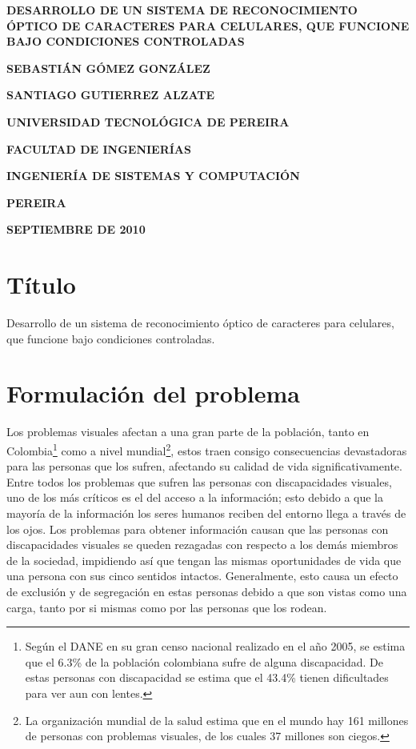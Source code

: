 \documentclass[a4paper, 11pt, oneside]{article}
\newcommand\portada{
	\begin{titlepage}
		\begin{center}
			{\large \bf DESARROLLO DE UN SISTEMA DE RECONOCIMIENTO ÓPTICO DE CARACTERES PARA CELULARES, QUE FUNCIONE BAJO CONDICIONES CONTROLADAS }
			\vfill
			{\large\bf SEBASTIÁN GÓMEZ GONZÁLEZ \par}
			{\large\bf SANTIAGO GUTIERREZ ALZATE \par}
			\vfill
			{\large\bf UNIVERSIDAD TECNOLÓGICA DE PEREIRA  \par}
			{\large\bf FACULTAD DE INGENIERÍAS \par}
			{\large\bf INGENIERÍA DE SISTEMAS Y COMPUTACIÓN \par}
			{\large\bf PEREIRA\par}
			{\large\bf SEPTIEMBRE DE 2010 \par}
		\end{center}
	\end{titlepage}
}
\begin{document}
\portada

	\clearpage
	\section{Título}

	Desarrollo de un sistema de reconocimiento óptico de caracteres para celulares, que funcione bajo condiciones controladas.
	
	\section{Formulación del problema}

	Los problemas visuales afectan a una gran parte de la población, tanto en Colombia\footnote{Según el DANE en su gran censo nacional realizado en el año 2005, se estima que el 6.3\% de la población colombiana sufre de alguna discapacidad. De estas personas con discapacidad se estima que el 43.4\% tienen dificultades para ver aun con lentes.} como a nivel mundial\footnote{La organización mundial de la salud estima que en el mundo hay 161 millones de personas con problemas visuales, de los cuales 37 millones son ciegos.}, estos traen consigo consecuencias devastadoras para las personas que los sufren, afectando su calidad de vida significativamente. Entre todos los problemas que sufren las personas con discapacidades visuales, uno de los más críticos es el del acceso a la información; esto debido a que la mayoría de la información los seres humanos reciben del entorno llega a través de los ojos. Los problemas para obtener información causan que las personas con discapacidades visuales se queden rezagadas con respecto a los demás miembros de la sociedad, impidiendo así que tengan las mismas oportunidades de vida que una persona con sus cinco sentidos intactos. Generalmente, esto causa un efecto de exclusión y de segregación en estas personas debido a que son vistas como una carga, tanto por si mismas como por las personas que los rodean. 
\end{document}
